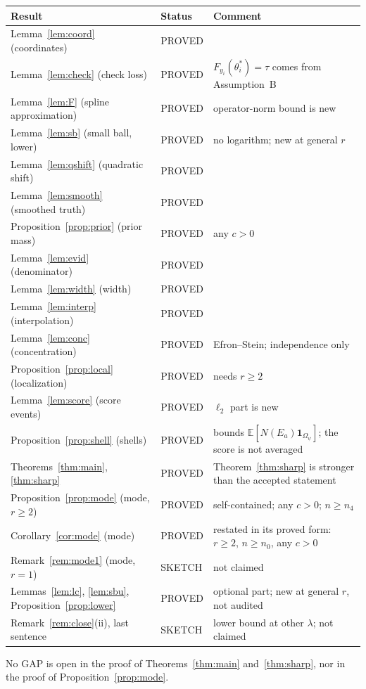 \documentclass[11pt]{article}
\theoremstyle{definition}
\theoremstyle{remark}
\newcommand{\E}{\mathbb{E}}
\newcommand{\thetas}{\theta^{*}}
\newcommand{\ind}{\mathbf 1}
\begin{document}
\begin{center}
\small
\begin{tabular}{llp{}}
\toprule
Result & Status & Comment\\
\midrule
Lemma~\ref{lem:coord} (coordinates) & PROVED & \\
Lemma~\ref{lem:check} (check loss) & PROVED & $F_{y_i}(\thetas_i)=\tau$ comes from Assumption~B\\
Lemma~\ref{lem:F} (spline approximation) & PROVED & operator-norm bound is new\\
Lemma~\ref{lem:sb} (small ball, lower) & PROVED & no logarithm; new at general $r$\\
Lemma~\ref{lem:qshift} (quadratic shift) & PROVED & \\
Lemma~\ref{lem:smooth} (smoothed truth) & PROVED & \\
Proposition~\ref{prop:prior} (prior mass) & PROVED & any $c>0$\\
Lemma~\ref{lem:evid} (denominator) & PROVED & \\
Lemma~\ref{lem:width} (width) & PROVED & \\
Lemma~\ref{lem:interp} (interpolation) & PROVED & \\
Lemma~\ref{lem:conc} (concentration) & PROVED & Efron--Stein; independence only\\
Proposition~\ref{prop:local} (localization) & PROVED & needs $r\ge2$\\
Lemma~\ref{lem:score} (score events) & PROVED & $\ell_2$ part is new\\
Proposition~\ref{prop:shell} (shells) & PROVED & bounds $\E[N(E_a)\ind_{\Omega_\psi}]$; the score is not averaged\\
Theorems~\ref{thm:main}, \ref{thm:sharp} & PROVED & Theorem~\ref{thm:sharp} is stronger than the accepted statement\\
Proposition~\ref{prop:mode} (mode, $r\ge2$) & PROVED & self-contained; any $c>0$; $n\ge n_4$\\
Corollary~\ref{cor:mode} (mode) & PROVED & restated in its proved form: $r\ge2$, $n\ge n_0$, any $c>0$\\
Remark~\ref{rem:mode1} (mode, $r=1$) & SKETCH & not claimed\\
Lemmas~\ref{lem:lc}, \ref{lem:sbu}, Proposition~\ref{prop:lower} & PROVED & optional part; new at general $r$, not audited\\
Remark~\ref{rem:close}(ii), last sentence & SKETCH & lower bound at other $\lambda$; not claimed\\
\bottomrule
\end{tabular}
\end{center}
No GAP is open in the proof of Theorems~\ref{thm:main} and~\ref{thm:sharp}, nor in the proof of Proposition~\ref{prop:mode}.
\end{document}
